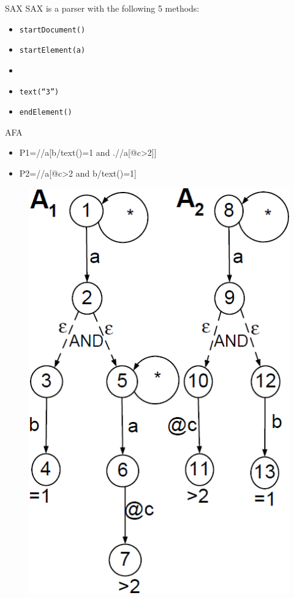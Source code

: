 \documentclass[mathserif,serif]{beamer}
\begin{document}
\begin{frame}{SAX}
  SAX is a parser with the following 5 methods:
  \begin{itemize}
    \item \texttt{startDocument()}
    \item \texttt{startElement(a)}
    \item \texttt{\@c}
    \item \texttt{text(``3'')}
    \item \texttt{endElement(\@c)}
  \end{itemize}
\end{frame}

\begin{frame}{AFA}
  \begin{minipage}{0.63\textwidth}
    \begin{itemize}
      \item P1=//a[b/text()=1 and .//a[@c>2]]
      \item P2=//a[@c>2 and b/text()=1]
    \end{itemize}
  \end{minipage}
  \begin{minipage}{0.35\textwidth}
  \begin{figure}
    \centering
    \includegraphics[width=\textwidth]{AFA.png}
  \end{figure}
\end{minipage}
\end{frame}
\end{document}

